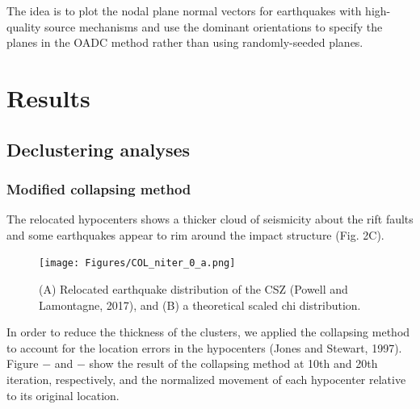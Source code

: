 \documentclass[draft]{agujournal2018}
\begin{document}
The idea is to plot the nodal plane normal vectors for earthquakes with high-quality source mechanisms and use the dominant orientations to specify the planes in the OADC method rather than using randomly-seeded planes. 







\section{Results}

\subsection{Declustering analyses}

\subsubsection{Modified collapsing method}
The relocated hypocenters shows a thicker cloud of seismicity about the rift faults and some earthquakes appear to rim around the impact structure (Fig. 2C).

\begin{figure}[ht]
\centering
\texttt{[image: Figures/COL\_niter\_0\_a.png]}
\caption{(A) Relocated earthquake distribution of the CSZ (Powell and Lamontagne, 2017), and (B) a theoretical scaled chi distribution.}
\label{figfour}
\end{figure} 

In order to reduce the thickness of the clusters, we applied the collapsing method to account for the location errors in the hypocenters (Jones and Stewart, 1997). Figure $-$ and $-$ show the result of the collapsing method at 10th and 20th iteration, respectively, and the normalized movement of each hypocenter relative to its original location. 
\end{document}
